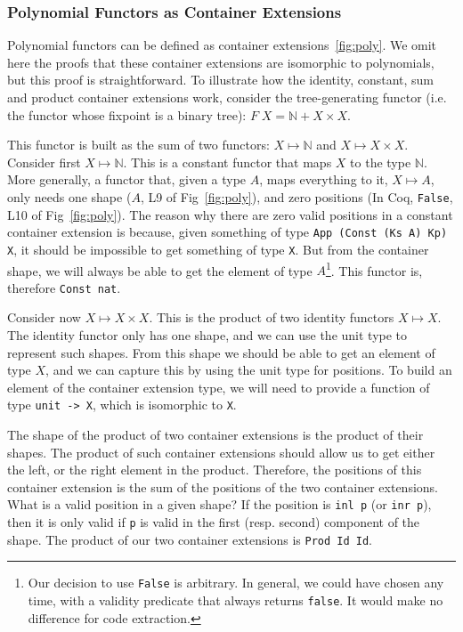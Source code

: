 \documentclass[a4paper, UKenglish, cleveref, autoref, thm-restate]{lipics-v2021}
\begin{document}
\subsubsection{Polynomial Functors as Container Extensions}

Polynomial functors can be defined as container extensions~\ref{fig:poly}. We
omit here the proofs that these container extensions are isomorphic to
polynomials, but this proof is straightforward. To illustrate how the identity,
constant, sum and product container extensions work, consider the
tree-generating functor (i.e. the functor whose fixpoint is a binary tree):
$F\; X = \mathbb{N} + X \times X$.

This functor is built as the sum of two functors: $X \mapsto \mathbb{N}$ and $X \mapsto
X \times X$. Consider first $X \mapsto \mathbb{N}$. This is a constant functor
that maps $X$ to the type $\mathbb{N}$. More generally, a functor that, given a
type $A$, maps everything to it, $X \mapsto A$, only needs one shape ($A$, L9
of Fig~\ref{fig:poly}), and zero positions (In Coq, \texttt{False},
L10 of Fig~\ref{fig:poly}). The reason why there are zero valid positions in
a constant container extension is because, given something of type 
\texttt{App (Const (Ks A) Kp) X}, it should be impossible to get
something of type \texttt{X}. But from the container shape, we will
always be able to get the element of type $A$\footnote{%
  Our decision to use \texttt{False} is arbitrary. In general, we
  could have chosen any time, with a validity predicate that always returns
  \texttt{false}. It would make no difference for code extraction.
}. This functor is, therefore \texttt{Const nat}.

Consider now $X \mapsto X \times X$. This is the product of two
identity functors $X \mapsto X$. The identity functor only has one shape, and
we can use the unit type to represent such shapes. From this shape we should be
able to get an element of type $X$, and we can capture this by using the unit
type for positions. To build an element of the container extension type, we
will need to provide a function of type \texttt{unit -> X}, which is
isomorphic to \texttt{X}. 

The shape of the product of two container extensions is the product of their
shapes. The product of such container extensions should allow us to get either
the left, or the right element in the product. Therefore, the positions of this
container extension is the sum of the positions of the two container
extensions. What is a valid position in a given shape? If the position is
\texttt{inl p} (or \texttt{inr p}), then it is only valid if
\texttt{p} is valid in the first (resp. second) component of the
shape. The product of our two container extensions is
\texttt{Prod Id Id}. 
\end{document}
